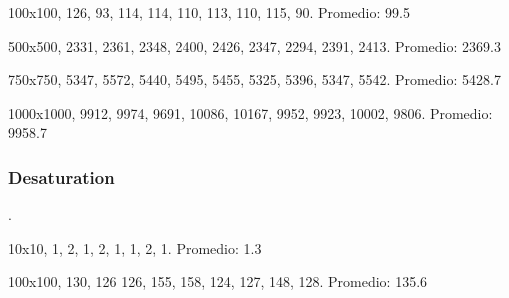 \documentclass[conference]{IEEEtran}
\begin{document}
100x100, 126, 93, 114, 114, 110, 113, 110, 115, 90.\newline
Promedio: 99.5
\newline

500x500, 2331, 2361, 2348, 2400, 2426, 2347, 2294, 2391, 2413.\newline
Promedio: 2369.3
\newline

750x750, 5347, 5572, 5440, 5495, 5455, 5325, 5396, 5347, 5542.\newline
Promedio: 5428.7
\newline

1000x1000, 9912, 9974, 9691, 10086, 10167, 9952, 9923, 10002, 9806.\newline
Promedio: 9958.7\newline

\newline

\subsubsection{Desaturation}

.
\newline

10x10, 1, 2, 1, 2, 1, 1, 2, 1.\newline
Promedio: 1.3
\newline

100x100, 130, 126 126, 155, 158, 124, 127, 148, 128.\newline
Promedio: 135.6 
\newline
\end{document}
